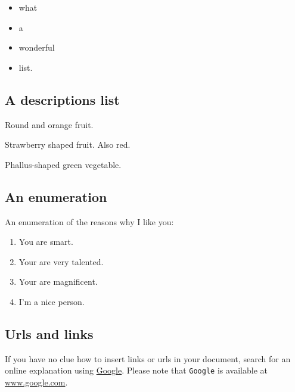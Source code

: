 \documentclass{42-en}
\begin{document}
            \begin{itemize}\itemsep1pt
                \item what
                \item a
                \item wonderful
                \item list.\\
            \end{itemize}


        \subsection{A descriptions list}

            \begin{description}\itemsep3pt
                \item [Orange:] Round and orange fruit.
                \item [Strawberry:] Strawberry shaped fruit. Also red.
                \item [Cucumber:] Phallus-shaped green vegetable.\\
            \end{description}


        \subsection{An enumeration}

            An enumeration of the reasons why I like you:\\

            \begin{enumerate}\itemsep7pt
                \item You are smart.
                \item Your are very talented.
                \item Your are magnificent.
                \item I'm a nice person.
            \end{enumerate}


        \subsection{Urls and links}

            If you have no clue how to insert links or urls in your
            document, search for an online explanation using
            \href{www.google.com}{Google}. Please note that \texttt{Google}
            is available at \url{www.google.com}.
\end{document}
